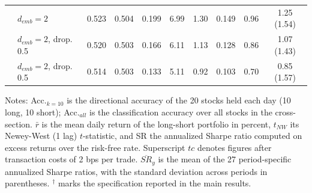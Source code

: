 \begin{table}[htbp]
\begin{tabular}{llcccccccc}
\quad 2 & $d_{emb}=2$ & 0.523 & 0.504 & 0.199 & 6.99 & 1.30 & 0.149 & 0.96 & 1.25 (1.54) \\
\quad 3 & $d_{emb}=2$, drop. 0.5 & 0.520 & 0.503 & 0.166 & 6.11 & 1.13 & 0.128 & 0.86 & 1.07 (1.43) \\
\quad 5 & $d_{emb}=2$, drop. 0.5 & 0.514 & 0.503 & 0.133 & 5.11 & 0.92 & 0.103 & 0.70 & 0.85 (1.57) \\
\bottomrule
\end{tabular}
\begin{minipage}{\textwidth}\vspace{2mm}\footnotesize
Notes: Acc.$_{k=10}$ is the directional accuracy of the 20 stocks held each day (10 long, 10 short); Acc.$_{all}$ is the classification accuracy over all stocks in the cross-section. $\bar{r}$ is the mean daily return of the long-short portfolio in percent, $t_{NW}$ its Newey-West (1 lag) $t$-statistic, and SR the annualized Sharpe ratio computed on excess returns over the risk-free rate. Superscript $tc$ denotes figures after transaction costs of 2 bps per trade. $\overline{SR}_{y}$ is the mean of the 27 period-specific annualized Sharpe ratios, with the standard deviation across periods in parentheses. $^{\dagger}$ marks the specification reported in the main results.
\end{minipage}
\end{table}
